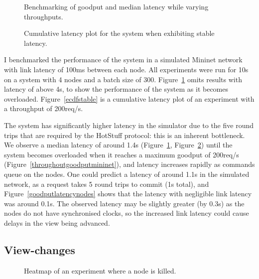 \begin{figure}[h!]
\centering
\resizebox{.5\textwidth}{!}{}
\caption{Benchmarking of goodput and median latency while varying throughputs.}
\label{goodputlatencymininet}
\end{figure}

\begin{figure}[h!]
\centering
\resizebox{.6\textwidth}{!}{}
\caption{Cumulative latency plot for the system when exhibiting stable latency.}
\label{ecdfmininet}
\end{figure}

I benchmarked the performance of the system in a simulated Mininet network~\cite{mininet,lantzNetworkLaptopRapid2010} with link latency of 100ms between each node. All experiments were run for 10s on a system with 4 nodes and a batch size of 300. Figure~\ref{goodputlatencymininet} omits results with latency of above 4s, to show the performance of the system as it becomes overloaded. Figure~\ref{ecdfstable} is a cumulative latency plot of an experiment with a throughput of 200req/s.

The system has significantly higher latency in the simulator due to the five round trips that are required by the HotStuff protocol: this is an inherent bottleneck. We observe a median latency of around 1.4s (Figure~\ref{goodputlatencymininet}, Figure~\ref{ecdfmininet}) until the system becomes overloaded when it reaches a maximum goodput of 200req/s (Figure~\ref{throughoutgoodputmininet}), and latency increases rapidly as commands queue on the nodes. One could predict a latency of around 1.1s in the simulated network, as a request takes 5 round trips to commit (1s total), and Figure~\ref{goodputlatencynodes} shows that the latency with negligible link latency was around 0.1s. The observed latency may be slightly greater (by 0.3s) as the nodes do not have synchronised clocks, so the increased link latency could cause delays in the view being advanced.

\subsection{View-changes} \label{viewchangeeval}

\begin{figure}[h!]
\centering
\resizebox{\textwidth}{!}{}
\caption{Heatmap of an experiment where a node is killed.}
\label{viewchangeheatmap}
\end{figure}

